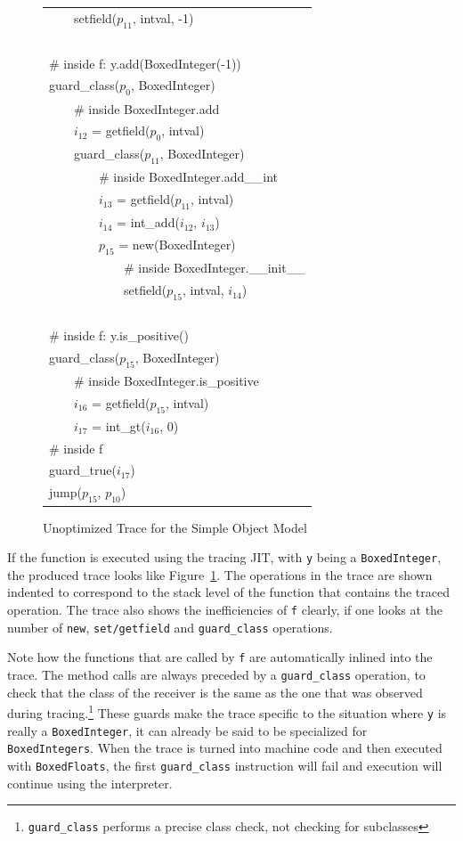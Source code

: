 \documentclass{sigplanconf}
\begin{document}
\begin{figure}
{\begin{tabular}{l}
~~~~setfield($p_{11}$, intval, -1) \\
~\\
\# inside f: y.add(BoxedInteger(-1)) \\
guard\_class($p_{0}$, BoxedInteger) \\
~~~~\# inside BoxedInteger.add \\
~~~~$i_{12}$ = getfield($p_{0}$, intval) \\
~~~~guard\_class($p_{11}$, BoxedInteger) \\
~~~~~~~~\# inside BoxedInteger.add\_\_int \\
~~~~~~~~$i_{13}$ = getfield($p_{11}$, intval) \\
~~~~~~~~$i_{14}$ = int\_add($i_{12}$, $i_{13}$) \\
~~~~~~~~$p_{15}$ = new(BoxedInteger) \\
~~~~~~~~~~~~\# inside BoxedInteger.\_\_init\_\_ \\
~~~~~~~~~~~~setfield($p_{15}$, intval, $i_{14}$) \\
~\\
\# inside f: y.is\_positive() \\
guard\_class($p_{15}$, BoxedInteger) \\
~~~~\# inside BoxedInteger.is\_positive \\
~~~~$i_{16}$ = getfield($p_{15}$, intval) \\
~~~~$i_{17}$ = int\_gt($i_{16}$, 0) \\
\# inside f \\
guard\_true($i_{17}$) \\
jump($p_{15}$, $p_{10}$) \\
\end{tabular}
}
\label{fig:unopt-trace}
\caption{Unoptimized Trace for the Simple Object Model}
\end{figure}

If the function is executed using the tracing JIT, with \texttt{y} being a
\texttt{BoxedInteger}, the produced trace looks like
Figure~\ref{fig:unopt-trace}. The operations in the trace are shown indented to
correspond to the stack level of the function that contains the traced
operation. The trace also shows the inefficiencies of \texttt{f} clearly, if one
looks at the number of \texttt{new}, \texttt{set/getfield} and
\texttt{guard\_class} operations.

Note how the functions that are called by \texttt{f} are automatically inlined
into the trace. The method calls are always preceded by a \texttt{guard\_class}
operation, to check that the class of the receiver is the same as the one that
was observed during tracing.\footnote{\texttt{guard\_class} performs a precise
class check, not checking for subclasses} These guards make the trace specific
to the situation where \texttt{y} is really a \texttt{BoxedInteger}, it can
already be said to be specialized for \texttt{BoxedIntegers}. When the trace is
turned into machine code and then executed with \texttt{BoxedFloats}, the
first \texttt{guard\_class} instruction will fail and execution will continue
using the interpreter.
\end{document}
